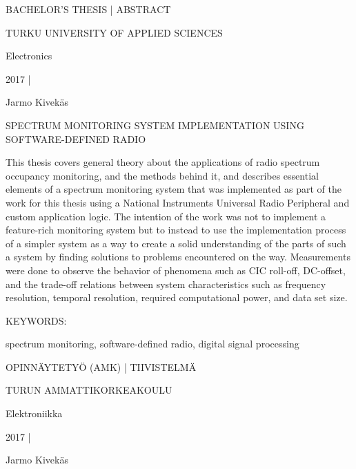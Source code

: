 BACHELOR'S THESIS | ABSTRACT

TURKU UNIVERSITY OF APPLIED SCIENCES

Electronics

2017 | \pageref{LastPage}


\vspace{7mm}
{\Large Jarmo Kivekäs \par}

\vspace{7mm}
{\huge SPECTRUM MONITORING SYSTEM IMPLEMENTATION USING SOFTWARE-DEFINED RADIO \par}

\vspace{7mm}



This thesis covers general theory about the applications of radio spectrum occupancy
monitoring, and the methods behind it, and describes essential elements of a
spectrum monitoring system that was implemented as part of the work for this
thesis using a National Instruments Universal Radio Peripheral and custom
application logic. The intention of the work was not to implement a feature-rich
monitoring system but to instead to use the implementation process of a simpler
system as a way to create a solid understanding of the parts of such
a system by finding solutions to problems encountered on the way.
Measurements were done to observe the behavior of phenomena such as CIC roll-off,
DC-offset, and the trade-off relations between system characteristics such as
frequency resolution, temporal resolution, required computational power,
and data set size.



\vspace{25mm}

KEYWORDS:

spectrum monitoring, software-defined radio, digital signal processing



\clearpage


OPINNÄYTETYÖ (AMK) | TIIVISTELMÄ

TURUN AMMATTIKORKEAKOULU

Elektroniikka

2017 | \pageref{LastPage}


\vspace{7mm}
{\Large Jarmo Kivekäs \par}

